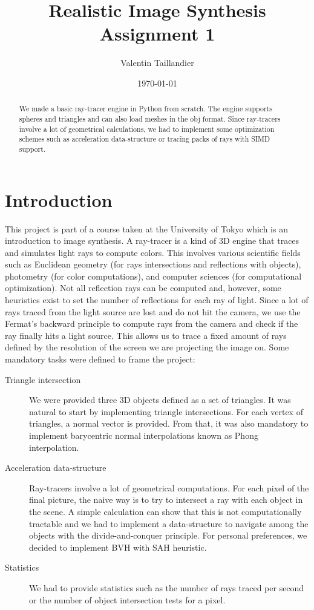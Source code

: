 \documentclass[a4paper,11pt]{article}%
\begin{document}
\title{Realistic Image Synthesis \\ Assignment 1}

\author{Valentin Taillandier}

\date{\today}

\maketitle

\begin{abstract}
We made a basic ray-tracer engine in Python from scratch.
The engine supports spheres and triangles and can also load meshes in the obj format.
Since ray-tracers involve a lot of geometrical calculations, we had to implement some optimization schemes such as acceleration data-structure or tracing packs of rays with SIMD support.
\end{abstract}

\section*{Introduction}
This project is part of a course taken at the University of Tokyo which is an introduction to image synthesis.
A ray-tracer is a kind of 3D engine that traces and simulates light rays to compute colors. 
This involves various scientific fields such as Euclidean geometry (for rays intersections and reflections with objects), photometry (for color computations), and computer sciences (for computational optimization).
Not all reflection rays can be computed and, however, some heuristics exist to set the number of reflections for each ray of light.
Since a lot of rays traced from the light source are lost and do not hit the camera, we use the Fermat's backward principle to compute rays from the camera and check if the ray finally hits a light source.
This allows us to trace a fixed amount of rays defined by the resolution of the screen we are projecting the image on.
Some mandatory tasks were defined to frame the project:
\begin{description}
\item[Triangle intersection] We were provided three 3D objects defined as a set of triangles. It was natural to start by implementing triangle intersections. For each vertex of triangles,
a normal vector is provided. From that, it was also mandatory to implement barycentric normal interpolations known as Phong interpolation.
\item[Acceleration data-structure] Ray-tracers involve a lot of geometrical computations. For each pixel of the final picture, the naive way is to try to intersect a ray with each object in the scene.
A simple calculation can show that this is not computationally tractable and we had to implement a data-structure to navigate among the objects with the divide-and-conquer principle.
For personal preferences, we decided to implement BVH with SAH heuristic.
\item[Statistics] We had to provide statistics such as the number of rays traced per second or the number of object intersection tests for a pixel.
\end{description}
\end{document}
